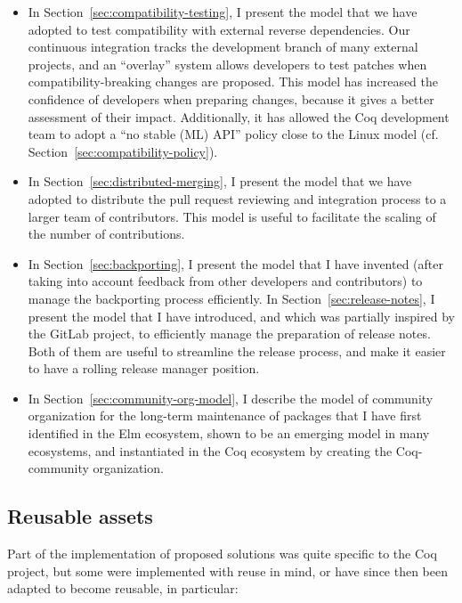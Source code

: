\begin{itemize}
	\item In Section~\ref{sec:compatibility-testing}, I present the model that we have adopted to test compatibility with external reverse dependencies. Our continuous integration tracks the development branch of many external projects, and an ``overlay'' system allows developers to test patches when compatibility-breaking changes are proposed. This model has increased the confidence of developers when preparing changes, because it gives a better assessment of their impact. Additionally, it has allowed the Coq development team to adopt a ``no stable (ML) API'' policy close to the Linux model (cf. Section~\ref{sec:compatibility-policy}).
	\item In Section~\ref{sec:distributed-merging}, I present the model that we have adopted to distribute the pull request reviewing and integration process to a larger team of contributors. This model is useful to facilitate the scaling of the number of contributions.
	\item In Section~\ref{sec:backporting}, I present the model that I have invented (after taking into account feedback from other developers and contributors) to manage the backporting process efficiently. In Section~\ref{sec:release-notes}, I present the model that I have introduced, and which was partially inspired by the GitLab project, to efficiently manage the preparation of release notes. Both of them are useful to streamline the release process, and make it easier to have a rolling release manager position.
	\item In Section~\ref{sec:community-org-model}, I describe the model of community organization for the long-term maintenance of packages that I have first identified in the Elm ecosystem, shown to be an emerging model in many ecosystems, and instantiated in the Coq ecosystem by creating the Coq-community organization.
\end{itemize}

\subsection{Reusable assets}

Part of the implementation of proposed solutions was quite specific to the Coq project, but some were implemented with reuse in mind, or have since then been adapted to become reusable, in particular:

